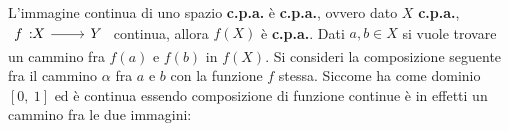 \begin{observe}
	L'immagine continua di uno spazio \textbf{c.p.a.} è \textbf{c.p.a.}, ovvero dato $X$ \textbf{c.p.a.}, $\funz f X Y$ continua, allora $f(X)$ è \textbf{c.p.a.}.\newline
	Dati $a,b\in X$ si vuole trovare un cammino fra $f(a)$ e $f(b)$ in $f(X)$. Si consideri la composizione seguente fra il cammino $\alpha$ fra $a$ e $b$ con la funzione $f$ stessa. Siccome ha come dominio $\left[0,\ 1\right]$ ed è continua essendo composizione di funzione continue è in effetti un cammino fra le due immagini:
\begin{center}
\end{center}
\vspace{-6mm}
\end{observe}
